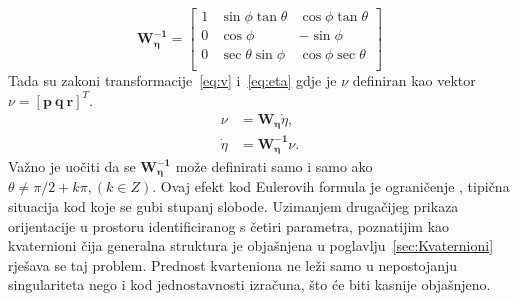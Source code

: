 \documentclass[times, utf8, diplomski]{fer}
\begin{document}
\begin{equation}
	\mathbf{W^{-1}_\eta} =
	\begin{bmatrix}
	1 & \sin\phi\tan\theta & \cos\phi\tan\theta \\
	0 & \cos\phi & -\sin\phi \\
	0 & \sec\theta\sin\phi & \cos\phi\sec\theta \\
	\end{bmatrix}
	\label{eq:matBrzina}
\end{equation}
Tada su zakoni transformacije~\ref{eq:v} i~\ref{eq:eta} gdje je $\nu$ definiran kao vektor $\nu=[\mathbf{p ~q ~r}]^T$.
\begin{align}
\nu&=\mathbf{W_\eta}\dot{\eta},\label{eq:v}\\
\dot{\eta}&=\mathbf{W^{-1}_\eta}\nu.\label{eq:eta}
\end{align}
Važno je uočiti da se $\mathbf{W^{-1}_\eta}$ može definirati samo i samo ako $\theta \neq \pi/2+k\pi, (k \in Z)$. Ovaj efekt kod Eulerovih formula je ograničenje , tipična situacija kod koje se gubi stupanj slobode. Uzimanjem drugačijeg prikaza orijentacije u prostoru identificiranog s četiri parametra, poznatijim kao kvaternioni čija generalna struktura je objašnjena u poglavlju~\ref{sec:Kvaternioni} rješava se taj problem. Prednost kvarteniona ne leži samo u nepostojanju singulariteta nego i kod jednostavnosti izračuna, što će biti kasnije objašnjeno.
\end{document}
